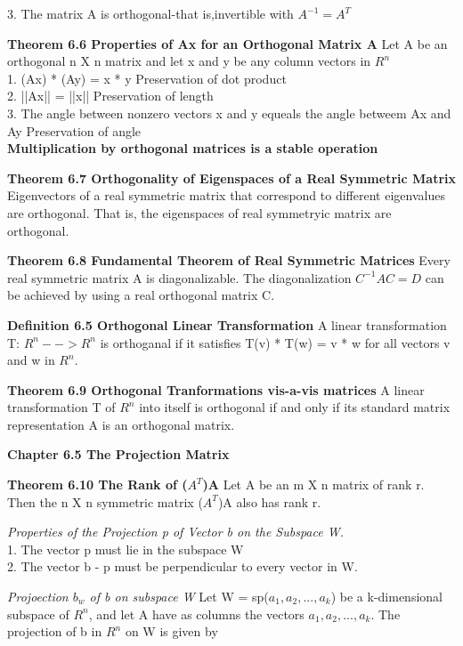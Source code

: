 \documentclass{article}
\begin{document}
3. The matrix A is orthogonal-that is,invertible with $A^{-1}= A^T$

\textbf {Theorem 6.6 Properties of Ax for an Orthogonal Matrix A}
Let A be an orthogonal n X n matrix and let x and y be any column vectors in $R^n$ \\
1. (Ax) * (Ay) = x * y                  Preservation of dot product \\
2. ||Ax|| = ||x||                          Preservation of length \\
3. The angle between nonzero vectors x and y equeals the angle betweem Ax and Ay				Preservation of angle \\

\textbf { Multiplication by orthogonal matrices is a stable operation}

\textbf {Theorem 6.7 Orthogonality of Eigenspaces of a Real Symmetric Matrix} \\ Eigenvectors of a real symmetric matrix that correspond to different eigenvalues are orthogonal. That is, the eigenspaces of real symmetryic matrix are orthogonal.

\textbf {Theorem 6.8 Fundamental Theorem of Real Symmetric Matrices} Every real symmetric matrix A is diagonalizable. The diagonalization $C^{-1}AC = D$ can be achieved by using a real orthogonal matrix C.

\textbf {Definition 6.5 Orthogonal Linear Transformation} A linear transformation T: $R^n-->R^n$ is orthoganal if it satisfies T(v) * T(w) = v * w for all vectors v and w in $R^n$.

\textbf {Theorem 6.9 Orthogonal Tranformations vis-a-vis matrices} A linear transformation T of $R^n$ into itself is orthogonal if and only if its standard matrix representation A is an orthogonal matrix.

\textbf {Chapter 6.5 The Projection Matrix}

\textbf {Theorem 6.10 The Rank of ($A^T$)A} Let A be an m X n matrix of rank r. Then the n X n symmetric matrix ($A^T$)A also has rank r.

\textit {Properties of the Projection p of Vector b on the Subspace W.} \\
1. The vector p must lie in the subspace W \\
2. The vector b - p must be perpendicular to every vector in W.

\textit {Projoection $b_w$ of b on subspace W} Let W = sp($a_1, a_2, ..., a_k$) be a k-dimensional subspace of $R^n$, and let A have as columns the vectors $a_1, a_2, ... , a_k$. The projection of b in $R^n$ on W is given by \\ 
\end{document}
